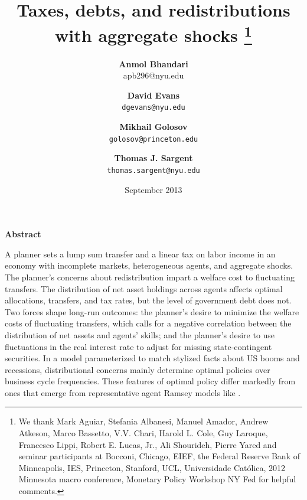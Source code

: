 \documentclass[thmsb,11pt]{article}
\begin{document}
\author{\textbf{Anmol Bhandari}\\apb296@nyu.edu \and \textbf{David Evans} \\ \texttt{dgevans@nyu.edu} \and \textbf{Mikhail Golosov}\\\texttt{golosov@princeton.edu} \and \textbf{Thomas J. Sargent} \\ \texttt{thomas.sargent@nyu.edu}
}
\title{\textbf{Taxes, debts,  and redistributions with aggregate shocks%
\thanks{%
We thank Mark Aguiar, Stefania Albanesi, Manuel Amador,  Andrew Atkeson, Marco Bassetto, V.V. Chari, Harold
L. Cole, Guy Laroque, Francesco Lippi, Robert E. Lucas, Jr., Ali Shourideh, Pierre Yared and seminar
participants at Bocconi, Chicago, EIEF, the Federal Reserve Bank of
Minneapolis, IES, Princeton, Stanford, UCL, Universidade Cat\'{o}lica, 2012
Minnesota macro conference, Monetary Policy Workshop NY Fed for helpful
comments.}}}
\date{September 2013}
\maketitle

\begin{center}
\textbf{Abstract}
\end{center}
A planner sets a lump sum transfer and a linear tax on labor income  in an economy with incomplete markets,  heterogeneous agents, and aggregate shocks. The planner's concerns about  redistribution impart a welfare cost to fluctuating transfers. The  distribution of  net asset holdings across agents affects optimal allocations, transfers, and tax rates, but the level of government debt does not. Two forces shape long-run outcomes: the planner's desire to minimize the welfare costs of fluctuating transfers, which calls for a negative correlation between the distribution of net  assets and agents' skills; and the planner's desire to use fluctuations in the real interest rate to adjust for missing state-contingent securities. In a model parameterized to match stylized facts about  US booms and recessions, distributional concerns  mainly determine optimal policies over business cycle frequencies.  These features of optimal policy differ markedly from ones that emerge from  representative agent Ramsey models
like \citet{Aiyagari2002}.

\medskip
\end{document}
